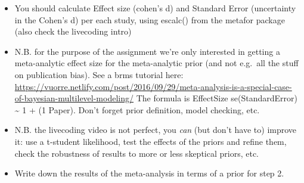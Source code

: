 \documentclass[
]{article}
\begin{document}
\begin{itemize}
\item
  You should calculate Effect size (cohen's d) and Standard Error
  (uncertainty in the Cohen's d) per each study, using escalc() from the
  metafor package (also check the livecoding intro)
\item
  N.B. for the purpose of the assignment we're only interested in
  getting a meta-analytic effect size for the meta-analytic prior (and
  not e.g.~all the stuff on publication bias). See a brms tutorial here:
  \url{https://vuorre.netlify.com/post/2016/09/29/meta-analysis-is-a-special-case-of-bayesian-multilevel-modeling/}
  The formula is EffectSize \textbar{} se(StandardError)
  \textasciitilde{} 1 + (1 \textbar{} Paper). Don't forget prior
  definition, model checking, etc.
\item
  N.B. the livecoding video is not perfect, you \emph{can} (but don't
  have to) improve it: use a t-student likelihood, test the effects of
  the priors and refine them, check the robustness of results to more or
  less skeptical priors, etc.
\item
  Write down the results of the meta-analysis in terms of a prior for
  step 2.
\end{itemize}
\end{document}
